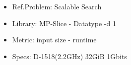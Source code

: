 \documentclass[8pt]{beamer}\setbeamertemplate{itemize item}{$-$}
\begin{document}
\begin{frame}
    \begin{figure}
        \begin{itemize}
            \item Ref.Problem: Scalable Search
            \item Library: MP-Slice - Datatype -d 1
            \item Metric: input size - runtime
            \item Specs: D-1518(2.2GHz) 32GiB 1Gbits
        \end{itemize}
    \end{figure}
\end{frame}
\end{document}
